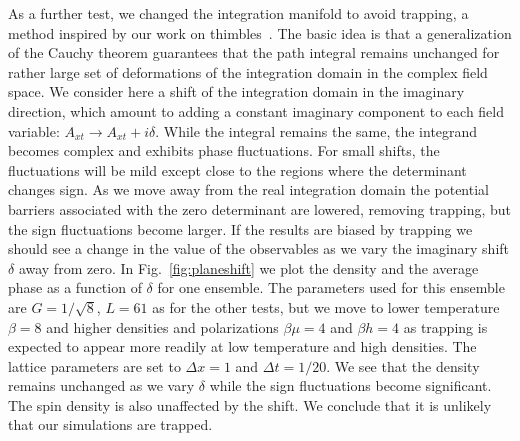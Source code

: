 \documentclass[aps,eqsecnum,amsmath,onecolumn,groupedaddress,superscriptaddress,notitlepage,nofootinbib]{revtex4-1}
\begin{document}
As a further test, we changed the integration
manifold to avoid trapping, a method inspired by our work on thimbles~\cite{Alexandru:2015sua}.
The basic idea is that a generalization of the Cauchy theorem guarantees that the path
integral remains unchanged for rather large set of deformations of the integration domain 
in the complex field space. We consider here a shift of the integration domain in the
imaginary direction, which amount to adding a constant imaginary component to each field
variable: $A_{xt}\to A_{xt}+i\delta$. While the integral remains the same, the integrand
becomes complex and exhibits phase fluctuations. For small shifts,
the fluctuations will be mild except close to the regions where the determinant changes
sign. As we move away from the real integration domain the potential barriers associated
with the zero determinant  are lowered, removing trapping, but the sign fluctuations 
become larger. If the results are biased by trapping we should see a change in the value
of the observables as we vary the imaginary shift $\delta$ away from zero.
In Fig.~\ref{fig:planeshift} we plot the density and the average phase as a function of $\delta$
for one ensemble. The parameters used for this ensemble are $G=1/\sqrt 8$, $L=61$ as for the
other tests, but we move to lower temperature $\beta=8$ and higher densities and polarizations
$\beta\mu=4$ and $\beta h=4$ as trapping is expected to appear more readily at low temperature
and high densities. The lattice parameters are set to $\Delta x=1$ and $\Delta t=1/20$. We
see that the density remains unchanged as we vary $\delta$ while the sign fluctuations become
significant. The spin density is also unaffected by the shift. 
We conclude that it is unlikely that our simulations are trapped.
\end{document}
